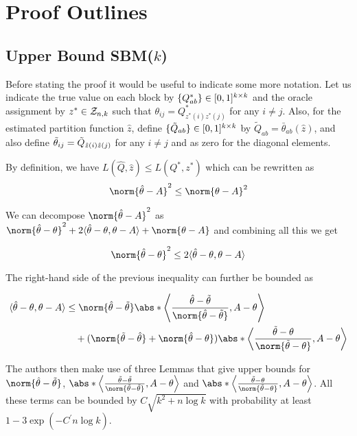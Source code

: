 \documentclass[11pt]{article}
\begin{document}
\section{Proof Outlines}\label{sec:proofs}

\subsection{Upper Bound SBM($k$)} \label{sec:upper_sbm}

Before stating the proof it would be useful to indicate some more notation. Let us indicate the true value on each block by $\{Q^\ast_{ab}\} \in \lbrack0,1\rbrack^{k \times k}$ and the oracle assignment by $z^\ast \in \mathcal{Z}_{n,k}$ such that $\theta_{ij} = Q^\ast_{z^\ast(i)z^\ast(j)}$ for any $i\neq j$. Also, for the estimated partition function $\hat{z}$, define $\{\tilde{Q}_{ab}\} \in \lbrack0,1\rbrack^{k \times k}$  by $\tilde{Q}_{ab} = \bar{\theta}_{ab}(\hat{z})$, and also define $\Tilde{\theta}_{ij}=\tilde{Q}_{\hat{z}(i)\hat{z}(j)}$ for any $i \neq j$ and as zero for the diagonal elements.

By definition, we have $L(\hat{Q},\hat{z}) \leq L(Q^\ast, z^\ast)$ which can be rewritten as
\[ \norm{\htheta - A}^2 \leq \norm{\theta - A}^2 \]

We can decompose $\norm{\htheta - A}^2$ as $\norm{\htheta - \theta}^2 + 2\dprod{\htheta - \theta, \theta - A} + \norm{\theta - A}$ and combining all this we get

\[  \norm{\htheta - \theta}^2 \leq 2\dprod{\htheta - \theta, \theta - A}  \]

The right-hand side of the previous inequality can further be bounded as

\begin{align*}
    \dprod{\htheta - \theta, \theta - A} & \leq \norm{\htheta - \ttheta}\abs*{\dprod*{\frac{\htheta-\ttheta}{\norm{\htheta - \ttheta}}, A - \theta  }} \\
  & \quad + (\norm{\ttheta - \htheta} + \norm{\htheta - \theta})\abs*{\dprod*{\frac{\ttheta-\theta}{\norm{\ttheta-\theta}},A-\theta}}
\end{align*}

The authors then make use of three Lemmas that give upper bounds for $\norm{\htheta-\ttheta}$, $\abs*{\dprod*{\frac{\ttheta-\ttheta}{\norm{\ttheta-\ttheta}},A-\theta}}$ and $\abs*{\dprod*{\frac{\ttheta-\theta}{\norm{\ttheta-\theta}},A-\theta}}$. All these terms can be bounded by $C\sqrt{k^2 +n\log k}$ with probability at least $1-3\exp(-C^\prime n\log k)$.
\end{document}
